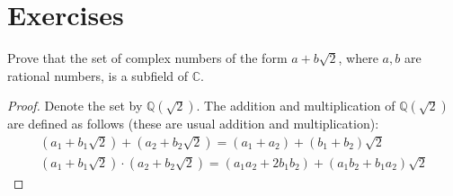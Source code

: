 \section*{Exercises}

\begin{exercise}
    Prove that the set of complex numbers of the form $a + b\sqrt{2}$, where $a, b$ are rational numbers, is a subfield of $\mathbb{C}$.
\end{exercise}

\begin{proof}
    Denote the set by $\mathbb{Q}(\sqrt{2})$. The addition and multiplication of $\mathbb{Q}(\sqrt{2})$ are defined as follows (these are usual addition and multiplication):
    \[
        \begin{split}
            (a_{1} + b_{1}\sqrt{2}) + (a_{2} + b_{2}\sqrt{2}) = (a_{1} + a_{2}) + (b_{1} + b_{2})\sqrt{2} \\
            (a_{1} + b_{1}\sqrt{2}) \cdot (a_{2} + b_{2}\sqrt{2}) = (a_{1}a_{2} + 2b_{1}b_{2}) + (a_{1}b_{2} + b_{1}a_{2})\sqrt{2}
        \end{split}
    \]


\end{proof}
